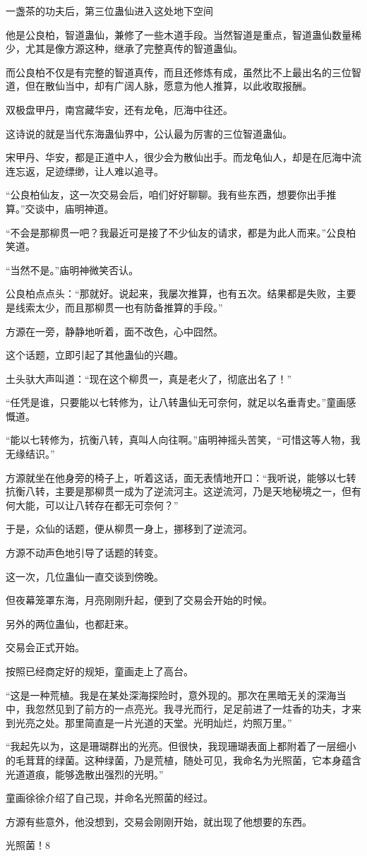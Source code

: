 \begin{this_body}
一盏茶的功夫后，第三位蛊仙进入这处地下空间

他是公良柏，智道蛊仙，兼修了一些木道手段。当然智道是重点，智道蛊仙数量稀少，尤其是像方源这种，继承了完整真传的智道蛊仙。

而公良柏不仅是有完整的智道真传，而且还修炼有成，虽然比不上最出名的三位智道，但在散仙当中，却有广阔人脉，愿意为他人推算，以此收取报酬。

双极盘甲丹，南宫藏华安，还有龙龟，厄海中往还。

这诗说的就是当代东海蛊仙界中，公认最为厉害的三位智道蛊仙。

宋甲丹、华安，都是正道中人，很少会为散仙出手。而龙龟仙人，却是在厄海中流连忘返，足迹缥缈，让人难以追寻。

“公良柏仙友，这一次交易会后，咱们好好聊聊。我有些东西，想要你出手推算。”交谈中，庙明神道。

“不会是那柳贯一吧？我最近可是接了不少仙友的请求，都是为此人而来。”公良柏笑道。

“当然不是。”庙明神微笑否认。

公良柏点点头：“那就好。说起来，我屡次推算，也有五次。结果都是失败，主要是线索太少，而且那柳贯一也有防备推算的手段。”

方源在一旁，静静地听着，面不改色，心中囧然。

这个话题，立即引起了其他蛊仙的兴趣。

土头驮大声叫道：“现在这个柳贯一，真是老火了，彻底出名了！”

“任凭是谁，只要能以七转修为，让八转蛊仙无可奈何，就足以名垂青史。”童画感慨道。

“能以七转修为，抗衡八转，真叫人向往啊。”庙明神摇头苦笑，“可惜这等人物，我无缘结识。”

方源就坐在他身旁的椅子上，听着这话，面无表情地开口：“我听说，能够以七转抗衡八转，主要是那柳贯一成为了逆流河主。这逆流河，乃是天地秘境之一，但有何大能，可以让八转存在都无可奈何？”

于是，众仙的话题，便从柳贯一身上，挪移到了逆流河。

方源不动声色地引导了话题的转变。

这一次，几位蛊仙一直交谈到傍晚。

但夜幕笼罩东海，月亮刚刚升起，便到了交易会开始的时候。

另外的两位蛊仙，也都赶来。

交易会正式开始。

按照已经商定好的规矩，童画走上了高台。

“这是一种荒植。我是在某处深海探险时，意外现的。那次在黑暗无关的深海当中，我忽然见到了前方的一点亮光。我寻光而行，足足前进了一炷香的功夫，才来到光亮之处。那里简直是一片光道的天堂。光明灿烂，灼照万里。”

“我起先以为，这是珊瑚群出的光亮。但很快，我现珊瑚表面上都附着了一层细小的毛茸茸的绿菌。这种绿菌，乃是荒植，随处可见，我命名为光照菌，它本身蕴含光道道痕，能够逸散出强烈的光明。”

童画徐徐介绍了自己现，并命名光照菌的经过。

方源有些意外，他没想到，交易会刚刚开始，就出现了他想要的东西。

光照菌！8

\end{this_body}

